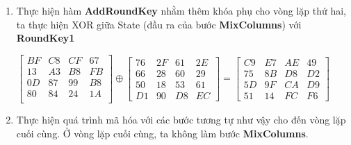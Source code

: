 \begin{enumerate}[label= \textbf{Bước \arabic*:}]
	Xét phần tử đầu tiên của $c_0$: 
	\begin{align*}
		c_0[0] &= (02 \cdot 30) \oplus (03 \cdot 67) \oplus (01 \cdot C0) \oplus (01 \cdot B6)\\
		c_0[0] &= 60 \oplus A9 \oplus C0 \oplus B6\\
		c_0[0] &= BF
	\end{align*}
	
	Thực hiện tương tự với các cột còn lại, ta thu được ouput của bước \textbf{MixColumns} như sau:
	\begin{center}
		$
		\begin{bmatrix}
			30 & 3C & A2 & C0\\
			67 & 72 & 7C & 01\\
			C0 & A3 & 7B & 63\\
			B6 & 85 & 6F & 9C\\
		\end{bmatrix}
		\xrightarrow{MixColumns}
		\begin{bmatrix}
			BF & C8 & CF & 67\\
			13 & A3 & B8 & FB\\
			0D & 87 & 99 & B8\\
			80 & 84 & 24 & 1A\\
		\end{bmatrix}
		$ 
		
		
	\end{center}
	
	\item Thực hiện hàm \textbf{AddRoundKey} nhằm thêm khóa phụ cho vòng lặp thứ hai, ta thực hiện XOR giữa State (đầu ra của bước \textbf{MixColumns}) với \textbf{RoundKey1}
	\begin{center}
		$
		\begin{bmatrix}
			BF & C8 & CF & 67\\
			13 & A3 & B8 & FB\\
			0D & 87 & 99 & B8\\
			80 & 84 & 24 & 1A\\
		\end{bmatrix}
		\oplus
		\begin{bmatrix}
			76 & 2F & 61 & 2E\\
			66 & 28 & 60 & 29 \\
			50 & 18 & 53 & 61 \\
			D1 & 90 & D8 & EC
		\end{bmatrix}
		=
		\begin{bmatrix}
			C9 & E7 & AE & 49\\
			75 & 8B & D8 & D2 \\
			5D & 9F & CA & D9 \\
			51 & 14 & FC & F6
		\end{bmatrix}
		$
	\end{center}
	\item Thực hiện quá trình mã hóa với các bước tương tự như vậy cho đến vòng lặp cuối cùng. Ở vòng lặp cuối cùng, ta không làm bước \textbf{MixColumns}.
	

\end{enumerate}
